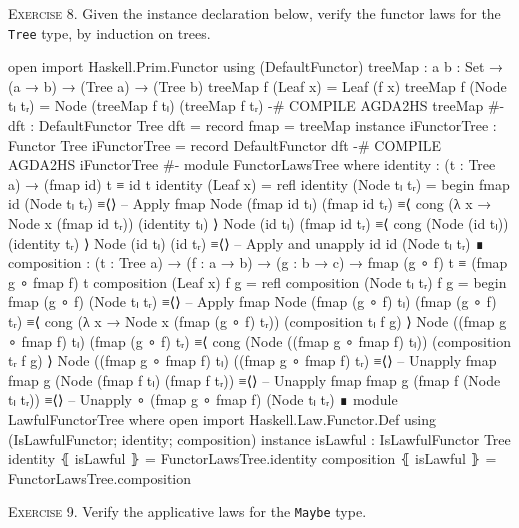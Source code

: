 \documentclass{article}
\begin{document}
\noindent
\textsc{Exercise 8.} Given the instance declaration below, verify the functor laws for the \texttt{Tree} type, by induction on trees.

\begin{code}
open import Haskell.Prim.Functor using (DefaultFunctor)
treeMap : {a b : Set} → (a → b) → (Tree a) → (Tree b)
treeMap f (Leaf x) = Leaf (f x)
treeMap f (Node tₗ tᵣ) = Node (treeMap f tₗ) (treeMap f tᵣ)
{-# COMPILE AGDA2HS treeMap #-}
dft : DefaultFunctor Tree
dft = record { fmap = treeMap }
instance
  iFunctorTree : Functor Tree
  iFunctorTree = record { DefaultFunctor dft }
  {-# COMPILE AGDA2HS iFunctorTree #-}
module FunctorLawsTree where
  identity : (t : Tree a) → (fmap id) t ≡ id t
  identity (Leaf x) = refl
  identity (Node tₗ tᵣ) =
    begin
      fmap id (Node tₗ tᵣ)
    ≡⟨⟩ -- Apply fmap
      Node (fmap id tₗ) (fmap id tᵣ)
    ≡⟨ cong (λ x → Node x (fmap id tᵣ)) (identity tₗ) ⟩
      Node (id tₗ) (fmap id tᵣ)
    ≡⟨ cong (Node (id tₗ)) (identity tᵣ) ⟩
      Node (id tₗ) (id tᵣ)
    ≡⟨⟩ -- Apply and unapply id
      id (Node tₗ tᵣ)
    ∎
  composition : (t : Tree a) → (f : a → b) → (g : b → c)
    → fmap (g ∘ f) t ≡ (fmap g ∘ fmap f) t
  composition (Leaf x) f g = refl
  composition (Node tₗ tᵣ) f g =
    begin
      fmap (g ∘ f) (Node tₗ tᵣ)
    ≡⟨⟩ -- Apply fmap
      Node (fmap (g ∘ f) tₗ) (fmap (g ∘ f) tᵣ)
    ≡⟨ cong (λ x → Node x (fmap (g ∘ f) tᵣ)) (composition tₗ f g) ⟩
      Node ((fmap g ∘ fmap f) tₗ) (fmap (g ∘ f) tᵣ)
    ≡⟨ cong (Node ((fmap g ∘ fmap f) tₗ)) (composition tᵣ f g) ⟩
      Node ((fmap g ∘ fmap f) tₗ) ((fmap g ∘ fmap f) tᵣ)
    ≡⟨⟩ -- Unapply fmap
      fmap g (Node (fmap f tₗ) (fmap f tᵣ))
    ≡⟨⟩ -- Unapply fmap
      fmap g (fmap f (Node tₗ tᵣ))
    ≡⟨⟩ -- Unapply ∘
      (fmap g ∘ fmap f) (Node tₗ tᵣ)
    ∎
module LawfulFunctorTree where
  open import Haskell.Law.Functor.Def
    using (IsLawfulFunctor; identity; composition)
  instance
    isLawful : IsLawfulFunctor Tree
    identity ⦃ isLawful ⦄ = FunctorLawsTree.identity
    composition ⦃ isLawful ⦄ = FunctorLawsTree.composition
\end{code}

\noindent
\textsc{Exercise 9.} Verify the applicative laws for the \texttt{Maybe} type.
\end{document}
